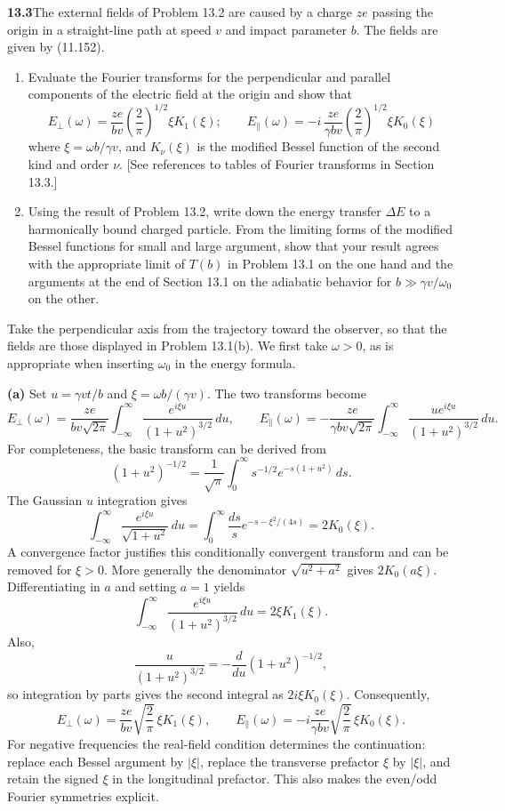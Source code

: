 \par\bigskip
\noindent\textbf{13.3}\quad The external fields of Problem 13.2 are caused by a charge $ze$ passing the origin in a straight-line path at speed $v$ and impact parameter $b$. The fields are given by (11.152).
\begin{enumerate}
\item[(a)] Evaluate the Fourier transforms for the perpendicular and parallel components of the electric field at the origin and show that
\[
E_{\perp}(\omega)=\frac{ze}{bv}\left(\frac{2}{\pi}\right)^{1/2}\!\xi K_{1}(\xi);\qquad
E_{\parallel}(\omega)=-i\,\frac{ze}{\gamma bv}\left(\frac{2}{\pi}\right)^{1/2}\!\xi K_{0}(\xi)
\]
where $\xi=\omega b/\gamma v$, and $K_{\nu}(\xi)$ is the modified Bessel function of the second kind and order $\nu$. [See references to tables of Fourier transforms in Section 13.3.]
\item[(b)] Using the result of Problem 13.2, write down the energy transfer $\Delta E$ to a harmonically bound charged particle. From the limiting forms of the modified Bessel functions for small and large argument, show that your result agrees with the appropriate limit of $T(b)$ in Problem 13.1 on the one hand and the arguments at the end of Section 13.1 on the adiabatic behavior for $b\gg\gamma v/\omega_{0}$ on the other.
\end{enumerate}
\solution
Take the perpendicular axis from the trajectory toward the observer, so
that the fields are those displayed in Problem 13.1(b). We first take
$\omega>0$, as is appropriate when inserting $\omega_0$ in the energy
formula.

\textbf{(a)} Set $u=\gamma vt/b$ and $\xi=\omega b/(\gamma v)$.
The two transforms become
\[
 E_\perp(\omega)=\frac{ze}{bv\sqrt{2\pi}}
   \int_{-\infty}^{\infty}
   \frac{e^{i\xi u}}{(1+u^2)^{3/2}}\,du,
 \qquad
 E_\parallel(\omega)=-\frac{ze}{\gamma bv\sqrt{2\pi}}
   \int_{-\infty}^{\infty}
   \frac{u e^{i\xi u}}{(1+u^2)^{3/2}}\,du.
\]
For completeness, the basic transform can be derived from
\[
 (1+u^2)^{-1/2}=\frac1{\sqrt\pi}
 \int_0^\infty s^{-1/2}e^{-s(1+u^2)}\,ds.
\]
The Gaussian $u$ integration gives
\[
 \int_{-\infty}^{\infty}\frac{e^{i\xi u}}{\sqrt{1+u^2}}\,du
 =\int_0^\infty\frac{ds}{s}e^{-s-\xi^2/(4s)}
 =2K_0(\xi).
\]
A convergence factor justifies this conditionally convergent transform
and can be removed for $\xi>0$. More generally the denominator
$\sqrt{u^2+a^2}$ gives $2K_0(a\xi)$. Differentiating in $a$ and setting
$a=1$ yields
\[
 \int_{-\infty}^{\infty}\frac{e^{i\xi u}}{(1+u^2)^{3/2}}\,du
 =2\xi K_1(\xi).
\]
Also,
\[
 \frac{u}{(1+u^2)^{3/2}}
 =-\frac{d}{du}(1+u^2)^{-1/2},
\]
so integration by parts gives the second integral as $2i\xi K_0(\xi)$.
Consequently,
\[
 \boxed{E_\perp(\omega)=\frac{ze}{bv}\sqrt{\frac2\pi}\,
          \xi K_1(\xi),\qquad
 E_\parallel(\omega)=-i\frac{ze}{\gamma bv}\sqrt{\frac2\pi}\,
          \xi K_0(\xi).}
\]
For negative frequencies the real-field condition determines the
continuation: replace each Bessel argument by $|\xi|$, replace the
transverse prefactor $\xi$ by $|\xi|$, and retain the signed $\xi$ in
the longitudinal prefactor. This also makes the even/odd Fourier
symmetries explicit.

